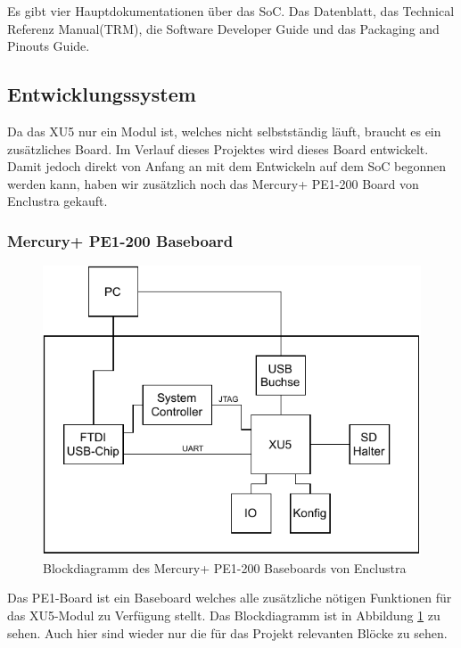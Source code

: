 \documentclass{article}
\begin{document}
Es gibt vier Hauptdokumentationen über das SoC. Das Datenblatt, das Technical Referenz Manual(TRM), die Software Developer Guide und das Packaging and Pinouts Guide.


\subsection{Entwicklungssystem}
Da das XU5 nur ein Modul ist, welches nicht selbstständig läuft, braucht es ein zusätzliches Board. Im Verlauf dieses Projektes wird dieses Board entwickelt. Damit jedoch direkt von Anfang an mit dem Entwickeln auf dem SoC begonnen werden kann, haben wir zusätzlich noch das Mercury+ PE1-200 Board von Enclustra gekauft. 

\subsubsection*{Mercury+ PE1-200 Baseboard}
\begin{figure}[tb]
    \includegraphics[width=\linewidth]{drawio/bd_pe1}
    \caption{Blockdiagramm des Mercury+ PE1-200 Baseboards von Enclustra}
    \label{fig:bd_pe1}
\end{figure}
Das PE1-Board ist ein Baseboard welches alle zusätzliche nötigen Funktionen für das XU5-Modul zu Verfügung stellt.
Das Blockdiagramm ist in Abbildung \ref{fig:bd_pe1} zu sehen. Auch hier sind wieder nur die für das Projekt relevanten Blöcke zu sehen. 
\end{document}

